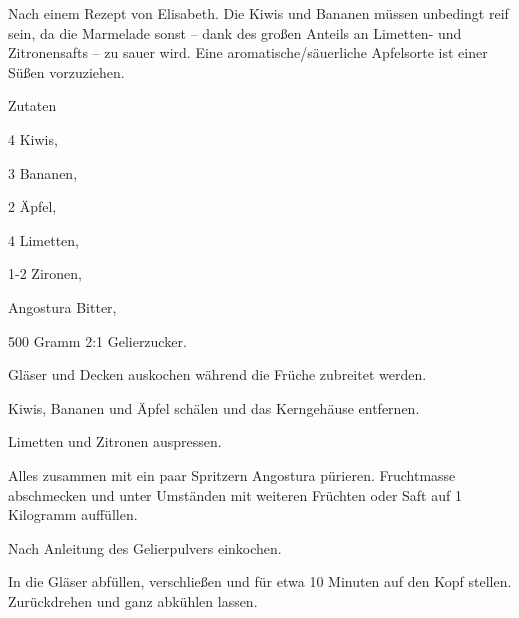 \startsection[title={Apfel/Kiwi/Bananen-Marmelade},reference=akibamarmelade]

Nach einem Rezept von Elisabeth. Die Kiwis und Bananen müssen unbedingt
reif sein, da die Marmelade sonst -- dank des großen Anteils an
Limetten- und Zitronensafts -- zu sauer wird. Eine
aromatische/säuerliche Apfelsorte ist einer Süßen vorzuziehen.

\startitemize
\item Zutaten
      \startitemize
      \item 4 Kiwis,
      \item 3 Bananen,
      \item 2 Äpfel,
      \item 4 Limetten,
      \item 1-2 Zironen,
      \item Angostura Bitter,
      \item 500 Gramm 2:1 Gelierzucker.
      \stopitemize

\item Gläser und Decken auskochen während die Früche zubreitet werden.
\item Kiwis, Bananen und Äpfel schälen und das Kerngehäuse entfernen.
\item Limetten und Zitronen auspressen.
\item Alles zusammen mit ein paar Spritzern Angostura pürieren.
      Fruchtmasse abschmecken und unter Umständen mit weiteren Früchten
      oder Saft auf 1 Kilogramm auffüllen.
\item Nach Anleitung des Gelierpulvers einkochen.
\item In die Gläser abfüllen, verschließen und für etwa 10 Minuten
      auf den Kopf stellen. Zurückdrehen und ganz abkühlen lassen.
\stopitemize

\stopsection
